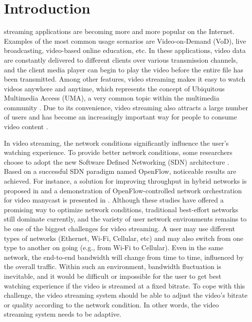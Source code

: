 \documentclass[journal,draftclsnofoot,onecolumn]{IEEEtran}
\begin{document}
\section{Introduction}
\label{sec:intro}
% 
% 
% 
% 
 streaming applications are becoming more and more popular on the Internet. Examples of the most common usage scenarios are Video-on-Demand (VoD), live broadcasting, video-based online education, etc. In these applications, video data are constantly delivered to different clients over various transmission channels, and the client media player can begin to play the video before the entire file has been transmitted. Among other features, video streaming makes it easy to watch videos anywhere and anytime, which represents the concept of Ubiquitous Multimedia Access (UMA), a very common topic within the multimedia community \cite{Gualdi08}. Due to its convenience, video streaming also attracts a large number of users and has become an increasingly important way for people to consume video content \cite{Chen13}.

In video streaming, the network conditions significantly influence the user's watching experience. To provide better network conditions, some researchers choose to adopt the new Software Defined Networking (SDN) architecture \cite{Egilmez14}. Based on a successful SDN paradigm named OpenFlow, noticeable results are achieved. For instance, a solution for improving throughput in hybrid networks is proposed in \cite{Li14} and a demonstration of OpenFlow-controlled network orchestration for video manycast is presented in \cite{Xue15}. Although these studies have offered a promising way to optimize network conditions, traditional best-effort networks still dominate currently, and the variety of user network environments remains to be one of the biggest challenges for video streaming. A user may use different types of networks (Ethernet, Wi-Fi, Cellular, etc) and may also switch from one type to another on going (e.g., from Wi-Fi to Cellular). Even in the same network, the end-to-end bandwidth will change from time to time, influenced by the overall traffic. Within such an environment, bandwidth fluctuation is inevitable, and it would be difficult or impossible for the user to get best watching experience if the video is streamed at a fixed bitrate. To cope with this challenge, the video streaming system should be able to adjust the video's bitrate or quality according to the network condition. In other words, the video streaming system needs to be adaptive.
\end{document}
